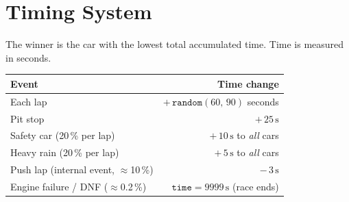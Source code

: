 \section{Timing System}

The winner is the car with the lowest total accumulated time. Time is measured in seconds.

\begin{longtable}{@{} l r @{}}
\toprule
\textbf{Event} & \textbf{Time change} \\
\midrule
\endhead
Each lap      & $+\,\texttt{random}(60,\,90)$ seconds \\
Pit stop      & $+\,25\,\text{s}$ \\
Safety car (20\,\% per lap) & $+\,10\,\text{s}$ to \emph{all} cars \\
Heavy rain (20\,\% per lap) & $+\,5\,\text{s}$ to \emph{all} cars \\
Push lap (internal event, $\approx$10\,\%) & $-\,3\,\text{s}$ \\
Engine failure / DNF ($\approx$0.2\,\%) & $\texttt{time} = 9999\,\text{s}$ (race ends) \\
\bottomrule
\end{longtable}
